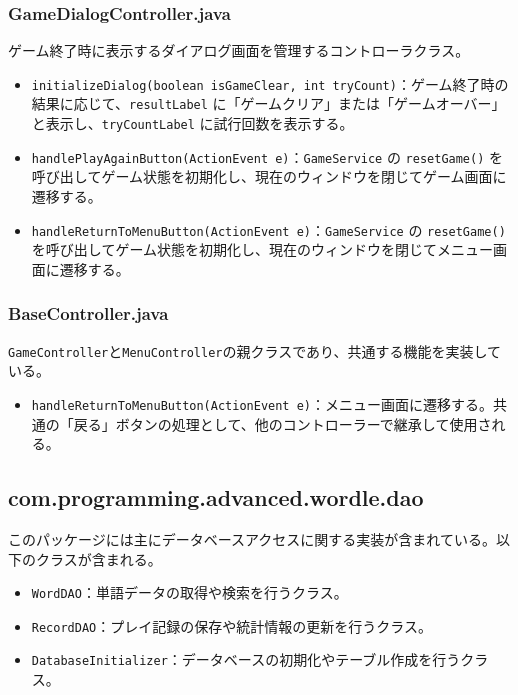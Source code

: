 \documentclass[a4j]{ujarticle}
\begin{document}
\subsubsection{GameDialogController.java}
ゲーム終了時に表示するダイアログ画面を管理するコントローラクラス。

\begin{itemize}
\item \texttt{initializeDialog(boolean isGameClear, int tryCount)}：ゲーム終了時の結果に応じて、\texttt{resultLabel} に「ゲームクリア」または「ゲームオーバー」と表示し、\texttt{tryCountLabel} に試行回数を表示する。
\item \texttt{handlePlayAgainButton(ActionEvent e)}：\texttt{GameService} の \texttt{resetGame()} を呼び出してゲーム状態を初期化し、現在のウィンドウを閉じてゲーム画面に遷移する。
\item \texttt{handleReturnToMenuButton(ActionEvent e)}：\texttt{GameService} の \texttt{resetGame()} を呼び出してゲーム状態を初期化し、現在のウィンドウを閉じてメニュー画面に遷移する。
\end{itemize}

\subsubsection{BaseController.java}
\texttt{GameController}と\texttt{MenuController}の親クラスであり、共通する機能を実装している。

\begin{itemize}
\item \texttt{handleReturnToMenuButton(ActionEvent e)}：メニュー画面に遷移する。共通の「戻る」ボタンの処理として、他のコントローラーで継承して使用される。
\end{itemize}

\subsection{com.programming.advanced.wordle.dao}
このパッケージには主にデータベースアクセスに関する実装が含まれている。以下のクラスが含まれる。
\begin{itemize}
  \item \texttt{WordDAO}：単語データの取得や検索を行うクラス。
  \item \texttt{RecordDAO}：プレイ記録の保存や統計情報の更新を行うクラス。
  \item \texttt{DatabaseInitializer}：データベースの初期化やテーブル作成を行うクラス。
\end{itemize}
\end{document}
